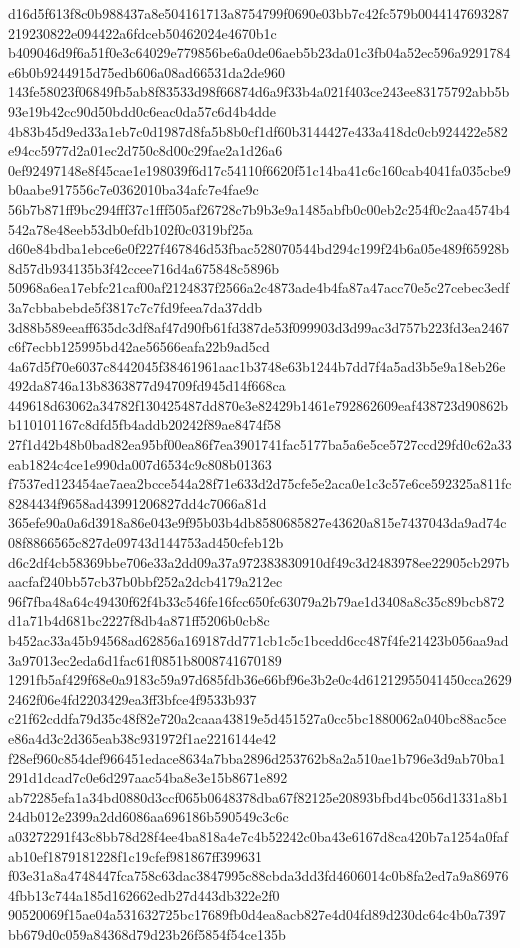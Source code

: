 \documentclass[11pt,a4paper]{article}
\begin{document}
{d16d5f613f8c0b988437a8e504161713a8754799f0690e03bb7c42fc579b0044147693287219230822e094422a6fdceb50462024e4670b1c
b409046d9f6a51f0e3c64029e779856be6a0de06aeb5b23da01c3fb04a52ec596a9291784e6b0b9244915d75edb606a08ad66531da2de960
143fe58023f06849fb5ab8f83533d98f66874d6a9f33b4a021f403ce243ee83175792abb5b93e19b42cc90d50bdd0c6eac0da57c6d4b4dde
4b83b45d9ed33a1eb7c0d1987d8fa5b8b0cf1df60b3144427e433a418dc0cb924422e582e94cc5977d2a01ec2d750c8d00c29fae2a1d26a6
0ef92497148e8f45cae1e198039f6d17c54110f6620f51c14ba41c6c160cab4041fa035cbe9b0aabe917556c7e0362010ba34afc7e4fae9c
56b7b871ff9bc294fff37c1fff505af26728c7b9b3e9a1485abfb0c00eb2c254f0c2aa4574b4542a78e48eeb53db0efdb102f0c0319bf25a
d60e84bdba1ebce6e0f227f467846d53fbac528070544bd294c199f24b6a05e489f65928b8d57db934135b3f42ccee716d4a675848c5896b
50968a6ea17ebfc21caf00af2124837f2566a2c4873ade4b4fa87a47acc70e5c27cebec3edf3a7cbbabebde5f3817c7c7fd9feea7da37ddb
3d88b589eeaff635dc3df8af47d90fb61fd387de53f099903d3d99ac3d757b223fd3ea2467c6f7ecbb125995bd42ae56566eafa22b9ad5cd
4a67d5f70e6037c8442045f38461961aac1b3748e63b1244b7dd7f4a5ad3b5e9a18eb26e492da8746a13b8363877d94709fd945d14f668ca
449618d63062a34782f130425487dd870e3e82429b1461e792862609eaf438723d90862bb110101167c8dfd5fb4addb20242f89ae8474f58
27f1d42b48b0bad82ea95bf00ea86f7ea3901741fac5177ba5a6e5ce5727ccd29fd0c62a33eab1824c4ce1e990da007d6534c9c808b01363
f7537ed123454ae7aea2bcce544a28f71e633d2d75cfe5e2aca0e1c3c57e6ce592325a811fc8284434f9658ad43991206827dd4c7066a81d
365efe90a0a6d3918a86e043e9f95b03b4db8580685827e43620a815e7437043da9ad74c08f8866565c827de09743d144753ad450cfeb12b
d6c2df4cb58369bbe706e33a2dd09a37a972383830910df49c3d2483978ee22905cb297baacfaf240bb57cb37b0bbf252a2dcb4179a212ec
96f7fba48a64c49430f62f4b33c546fe16fcc650fc63079a2b79ae1d3408a8c35c89bcb872d1a71b4d681bc2227f8db4a871ff5206b0cb8c
b452ac33a45b94568ad62856a169187dd771cb1c5c1bcedd6cc487f4fe21423b056aa9ad3a97013ec2eda6d1fac61f0851b8008741670189
1291fb5af429f68e0a9183c59a97d685fdb36e66bf96e3b2e0c4d61212955041450cca26292462f06e4fd2203429ea3ff3bfce4f9533b937
c21f62cddfa79d35c48f82e720a2caaa43819e5d451527a0cc5bc1880062a040bc88ac5cee86a4d3c2d365eab38c931972f1ae2216144e42
f28ef960c854def966451edace8634a7bba2896d253762b8a2a510ae1b796e3d9ab70ba1291d1dcad7c0e6d297aac54ba8e3e15b8671e892
ab72285efa1a34bd0880d3ccf065b0648378dba67f82125e20893bfbd4bc056d1331a8b124db012e2399a2dd6086aa696186b590549c3c6c
a03272291f43c8bb78d28f4ee4ba818a4e7c4b52242c0ba43e6167d8ca420b7a1254a0fafab10ef1879181228f1c19cfef981867ff399631
f03e31a8a4748447fca758c63dac3847995c88cbda3dd3fd4606014c0b8fa2ed7a9a869764fbb13c744a185d162662edb27d443db322e2f0
90520069f15ae04a531632725bc17689fb0d4ea8acb827e4d04fd89d230dc64c4b0a7397bb679d0c059a84368d79d23b26f5854f54ce135b
}
\end{document}
